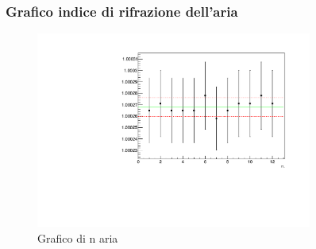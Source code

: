 \subsubsection{Grafico indice di rifrazione dell'aria}
\begin{figure}[H]
    \centering
    \includegraphics[width=0.81\textwidth]{graphn.pdf}
    \caption{Grafico di n aria}
\end{figure}